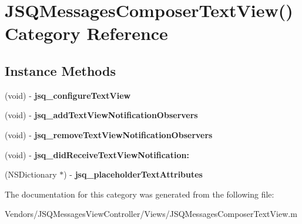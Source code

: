 \hypertarget{category_j_s_q_messages_composer_text_view_07_08}{}\section{J\+S\+Q\+Messages\+Composer\+Text\+View() Category Reference}
\label{category_j_s_q_messages_composer_text_view_07_08}
\subsection*{Instance Methods}
\begin{DoxyCompactItemize}
\item 
\hypertarget{category_j_s_q_messages_composer_text_view_07_08_af1af1f48aaf2667e4bb1f3907234f503}{}(void) -\/ {\bfseries jsq\+\_\+configure\+Text\+View}\label{category_j_s_q_messages_composer_text_view_07_08_af1af1f48aaf2667e4bb1f3907234f503}

\item 
\hypertarget{category_j_s_q_messages_composer_text_view_07_08_ad7548fc42eb16a200efaab40769abaa8}{}(void) -\/ {\bfseries jsq\+\_\+add\+Text\+View\+Notification\+Observers}\label{category_j_s_q_messages_composer_text_view_07_08_ad7548fc42eb16a200efaab40769abaa8}

\item 
\hypertarget{category_j_s_q_messages_composer_text_view_07_08_a20672181c5c0d7aa45ab389dd00c02c1}{}(void) -\/ {\bfseries jsq\+\_\+remove\+Text\+View\+Notification\+Observers}\label{category_j_s_q_messages_composer_text_view_07_08_a20672181c5c0d7aa45ab389dd00c02c1}

\item 
\hypertarget{category_j_s_q_messages_composer_text_view_07_08_a0c5819cc20e721f618b52e060a880fa9}{}(void) -\/ {\bfseries jsq\+\_\+did\+Receive\+Text\+View\+Notification\+:}\label{category_j_s_q_messages_composer_text_view_07_08_a0c5819cc20e721f618b52e060a880fa9}

\item 
\hypertarget{category_j_s_q_messages_composer_text_view_07_08_a92a2330d00145cc9943a36acab7d095f}{}(N\+S\+Dictionary $\ast$) -\/ {\bfseries jsq\+\_\+placeholder\+Text\+Attributes}\label{category_j_s_q_messages_composer_text_view_07_08_a92a2330d00145cc9943a36acab7d095f}

\end{DoxyCompactItemize}


The documentation for this category was generated from the following file\+:\begin{DoxyCompactItemize}
\item 
Vendors/\+J\+S\+Q\+Messages\+View\+Controller/\+Views/J\+S\+Q\+Messages\+Composer\+Text\+View.\+m\end{DoxyCompactItemize}
